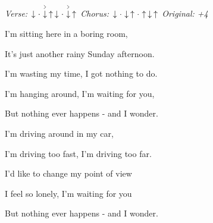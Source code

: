 \begin{song}


 \quad
\textit{Verse:} $\Down\Miss\AccentDown\Up \Down\Miss\AccentDown\Up$ \quad
\textit{Chorus:} $\Down\Miss\Down\Up\Miss\Up\Down\Up$ \quad
\textit{Original: +4}

\normalsize

\begin{chordbox}
 \par
{} \par
{} \par
{} \par
{} \par
{} \par
{} \par
{} \par
{} \par
\end{chordbox}

\large


\bigskip

I'm sitting here in a boring room, \par
It's just another rainy Sunday afternoon. \par
I'm wasting my time, I got nothing to do. \par
I'm hanging around, I'm waiting for you, \par
But nothing ever happens -  and I wonder.   \par

\bigskip

I'm driving around in my car, \par
I'm driving too fast, I'm driving too far. \par
I'd like to change my point of view \par
I feel so lonely, I'm waiting for you \par
But nothing ever happens -  and I wonder.   \par


\end{song}
